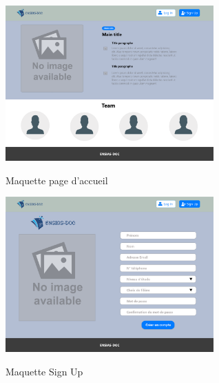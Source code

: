 \documentclass{article}
\begin{document}
{\begin{minipage}[c]{.46\linewidth}
     \begin{center}
             \includegraphics[width=8cm]{Page de garde (1).png}
             \caption{Maquette page d'accueil}
             \label{fig:Maquette page d'accueil.}
         \end{center}
   \end{minipage} \hfill
   \begin{minipage}[c]{.46\linewidth}
    \begin{center}
            \includegraphics[width=8cm]{Sign Up (1).png}
            \caption{Maquette Sign Up}
            \label{Maquette Sign Up}
        \end{center}
 \end{minipage}

}
\end{document}
